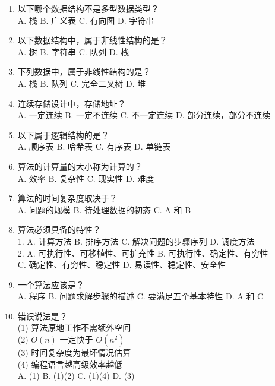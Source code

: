 \documentclass[lang=cn,newtx,10pt,scheme=chinese]{elegantbook}
\begin{document}
\begin{enumerate}
    \item 以下哪个数据结构不是多型数据类型？\\
    A. 栈 \quad B. 广义表 \quad C. 有向图 \quad D. 字符串

    \item 以下数据结构中，属于非线性结构的是？\\
    A. 树 \quad B. 字符串 \quad C. 队列 \quad D. 栈

    \item 下列数据中，属于非线性结构的是？\\
    A. 栈 \quad B. 队列 \quad C. 完全二叉树 \quad D. 堆

    \item 连续存储设计中，存储地址？\\
    A. 一定连续 \quad B. 一定不连续 \quad C. 不一定连续 \quad D. 部分连续，部分不连续

    \item 以下属于逻辑结构的是？\\
    A. 顺序表 \quad B. 哈希表 \quad C. 有序表 \quad D. 单链表

    \item 算法的计算量的大小称为计算的？\\
    A. 效率 \quad B. 复杂性 \quad C. 现实性 \quad D. 难度

    \item 算法的时间复杂度取决于？\\
    A. 问题的规模 \quad B. 待处理数据的初态 \quad C. A 和 B

    \item 算法必须具备的特性？\\
    1. A. 计算方法 \quad B. 排序方法 \quad C. 解决问题的步骤序列 \quad D. 调度方法\\
    2. A. 可执行性、可移植性、可扩充性 \quad B. 可执行性、确定性、有穷性 \\
       C. 确定性、有穷性、稳定性 \quad D. 易读性、稳定性、安全性

    \item 一个算法应该是？\\
    A. 程序 \quad B. 问题求解步骤的描述 \quad C. 要满足五个基本特性 \quad D. A 和 C

    \item 错误说法是？\\
    (1) 算法原地工作不需额外空间 \\ (2) $O(n)$ 一定快于 $O(n^2)$ \\ (3) 时间复杂度为最坏情况估算 \\ (4) 编程语言越高级效率越低 \\
    A. (1) \quad B. (1)(2) \quad C. (1)(4) \quad D. (3)


\end{enumerate}
\end{document}
